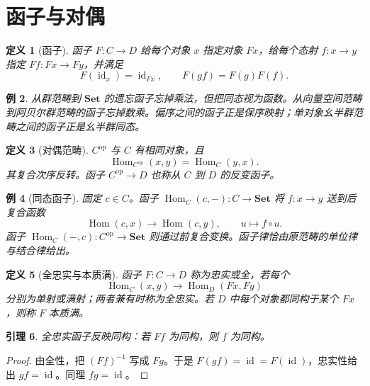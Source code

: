 \documentclass[12pt,oneside,openany,fontset=none]{ctexbook}
\theoremstyle{cn}
\newtheorem{definition}{定义}[chapter]
\newtheorem{example}[definition]{例}
\newtheorem{lemma}[definition]{引理}
\numberwithin{equation}{chapter}
\newcommand{\Set}{\mathbf{Set}}
\newcommand{\id}{\operatorname{id}}
\newcommand{\Hom}{\operatorname{Hom}}
\newcommand{\op}{\mathrm{op}}
\begin{document}
\section{函子与对偶}
\begin{definition}[函子]
函子 $F:C\to D$ 给每个对象 $x$ 指定对象 $Fx$，给每个态射 $f:x\to y$ 指定 $Ff:Fx\to Fy$，并满足
\[
F(\id_x)=\id_{Fx},\qquad F(gf)=F(g)F(f).
\]
\end{definition}
\begin{example}
从群范畴到 $\Set$ 的遗忘函子忘掉乘法，但把同态视为函数。从向量空间范畴到阿贝尔群范畴的函子忘掉数乘。偏序之间的函子正是保序映射；单对象幺半群范畴之间的函子正是幺半群同态。
\end{example}
\begin{definition}[对偶范畴]
$C^\op$ 与 $C$ 有相同对象，且
\[
\Hom_{C^\op}(x,y)=\Hom_C(y,x).
\]
其复合次序反转。函子 $C^\op\to D$ 也称从 $C$ 到 $D$ 的反变函子。
\end{definition}
\begin{example}[同态函子]
固定 $c\in C$。函子 $\Hom_C(c,-):C\to\Set$ 将 $f:x\to y$ 送到后复合函数
\[
\Hom(c,x)\to\Hom(c,y),\qquad u\mapsto f\circ u.
\]
函子 $\Hom_C(-,c):C^\op\to\Set$ 则通过前复合变换。函子律恰由原范畴的单位律与结合律给出。
\end{example}
\begin{definition}[全忠实与本质满]
函子 $F:C\to D$ 称为忠实或全，若每个
\[
\Hom_C(x,y)\to\Hom_D(Fx,Fy)
\]
分别为单射或满射；两者兼有时称为全忠实。若 $D$ 中每个对象都同构于某个 $Fx$，则称 $F$ 本质满。
\end{definition}
\begin{lemma}
全忠实函子反映同构：若 $Ff$ 为同构，则 $f$ 为同构。
\end{lemma}
\begin{proof}
由全性，把 $(Ff)^{-1}$ 写成 $Fg$。于是 $F(gf)=\id=F(\id)$，忠实性给出 $gf=\id$。同理 $fg=\id$。
\end{proof}
\end{document}
